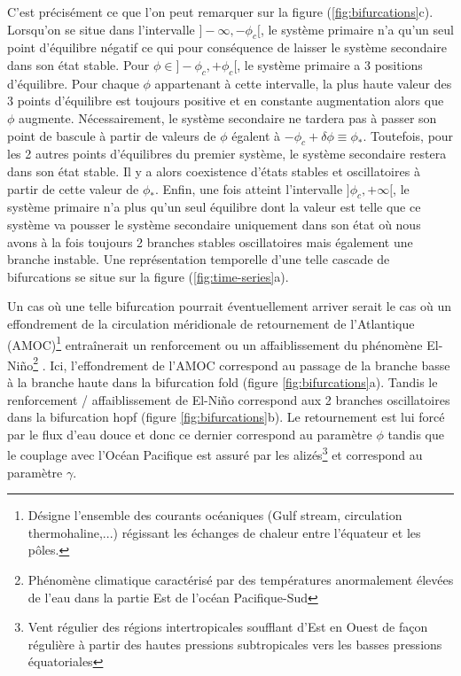 C'est précisément ce que l'on peut remarquer sur la figure (\ref{fig:bifurcations}c). Lorsqu'on se situe dans l'intervalle $]-\infty, -\phi_c[$, le système primaire n'a qu'un seul point d'équilibre négatif ce qui pour conséquence de laisser le système secondaire dans son état stable. Pour $\phi \in ]-\phi_c, +\phi_c[$, le système primaire a 3 positions d'équilibre. Pour chaque $\phi$ appartenant à cette intervalle, la plus haute valeur des 3 points d'équilibre est toujours positive et en constante augmentation alors que $\phi$ augmente. Nécessairement, le système secondaire ne tardera pas à passer son point de bascule à partir de valeurs de $\phi$ égalent à $-\phi_c + \delta \phi \equiv \phi_{\ast}$. Toutefois, pour les 2 autres points d'équilibres du premier système, le système secondaire restera dans son état stable. Il y a alors coexistence d'états stables et oscillatoires à partir de cette valeur de $\phi_{\ast}$. Enfin, une fois atteint l'intervalle $]\phi_c, +\infty[$, le système primaire n'a plus qu'un seul équilibre dont la valeur est telle que ce système va pousser le système secondaire uniquement dans son état où nous avons à la fois toujours 2 branches stables oscillatoires mais également une branche instable. Une représentation temporelle d'une telle cascade de bifurcations se situe sur la figure (\ref{fig:time-series}a).

Un cas où une telle bifurcation pourrait éventuellement arriver serait le cas où un effondrement de la circulation méridionale de retournement de l'Atlantique (AMOC)\footnote{Désigne l'ensemble des courants océaniques (Gulf stream, circulation thermohaline,...) régissant les échanges de chaleur entre l'équateur et les pôles.} entraînerait un renforcement ou un affaiblissement du phénomène El-Niño\footnote{Phénomène climatique caractérisé par des températures anormalement élevées de l'eau dans la partie Est de l'océan Pacifique-Sud} \cite{timmermann_influence_2007}. Ici, l'effondrement de l'AMOC correspond au passage de la branche basse à la branche haute dans la bifurcation fold (figure \ref{fig:bifurcations}a). Tandis le renforcement / affaiblissement de El-Niño correspond aux 2 branches oscillatoires dans la bifurcation hopf (figure \ref{fig:bifurcations}b). Le retournement est lui forcé par le flux d'eau douce et donc ce dernier correspond au paramètre $\phi$ tandis que le couplage avec l'Océan Pacifique est assuré par les alizés\footnote{Vent régulier des régions intertropicales soufflant d'Est en Ouest de façon régulière à partir des hautes pressions subtropicales vers les basses pressions équatoriales} et correspond au paramètre $\gamma$.

